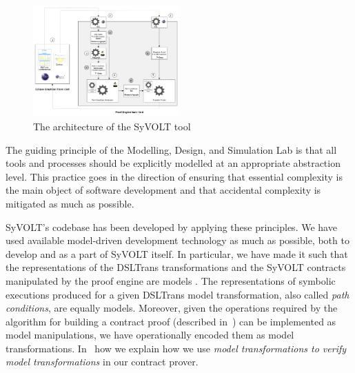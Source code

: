 \begin{figure}
\centering
\includegraphics[width=0.5\textwidth]{figures/syvolt_arch}
\caption{The architecture of the SyVOLT tool}
\label{fig:arch}
\end{figure}

The guiding principle of the Modelling, Design, and Simulation Lab is that all
tools and processes should be explicitly modelled at an appropriate abstraction level.
This practice goes in the direction of ensuring that essential
complexity is the main object of software development and that accidental
complexity is mitigated as much as possible.

SyVOLT's codebase has been developed by applying these principles. We have used
available model-driven development technology as much as possible, both to
develop and as a part of SyVOLT itself. In particular, we have made it such
that the representations of the DSLTrans transformations and the SyVOLT
contracts manipulated by the proof engine are models . The representations of symbolic
executions produced for a given DSLTrans model transformation, also called
\emph{path conditions}, are equally models. Moreover, given the operations
required by the algorithm for building a contract proof (described in~\cite{Lucio2014}) can be implemented as model
manipulations, we have operationally encoded them as model transformations.
In~\cite{LucioVang} how we explain how we use \emph{model transformations to
verify model transformations} in our contract prover.\\

